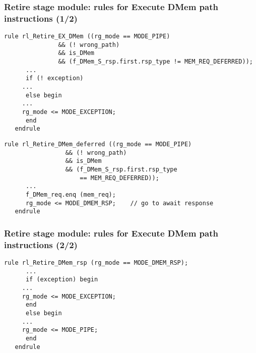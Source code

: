 \begin{frame}[fragile]
\frametitle{Retire stage module: rules for Execute DMem path instructions (1/2)}

\footnotesize

\begin{minipage}{0.725\textwidth}\scriptsize
\begin{Verbatim}[frame=single, label=From Code/src\_Fife/S5\_Retire.bsv]
   rule rl_Retire_EX_DMem ((rg_mode == MODE_PIPE)
			   && (! wrong_path)
			   && is_DMem
			   && (f_DMem_S_rsp.first.rsp_type != MEM_REQ_DEFERRED));
      ...
      if (! exception)
	 ...
      else begin
	 ...
	 rg_mode <= MODE_EXCEPTION;
      end
   endrule
\end{Verbatim}
\end{minipage}

\vspace{2ex}

\begin{minipage}{0.725\textwidth}\scriptsize
\begin{Verbatim}[frame=single, label=From Code/src\_Fife/S5\_Retire.bsv]
   rule rl_Retire_DMem_deferred ((rg_mode == MODE_PIPE)
				 && (! wrong_path)
				 && is_DMem
				 && (f_DMem_S_rsp.first.rsp_type
				     == MEM_REQ_DEFERRED));
      ...
      f_DMem_req.enq (mem_req);
      rg_mode <= MODE_DMEM_RSP;    // go to await response
   endrule
\end{Verbatim}
\end{minipage}

\end{frame}


\begin{frame}[fragile]
\frametitle{Retire stage module: rules for Execute DMem path instructions (2/2)}

\footnotesize

\begin{minipage}{0.725\textwidth}
\begin{Verbatim}[frame=single, label=From Code/src\_Fife/S5\_Retire.bsv]
   rule rl_Retire_DMem_rsp (rg_mode == MODE_DMEM_RSP);
      ...
      if (exception) begin
	 ...
	 rg_mode <= MODE_EXCEPTION;
      end
      else begin
	 ...
	 rg_mode <= MODE_PIPE;
      end
   endrule
\end{Verbatim}
\end{minipage}

\end{frame}

